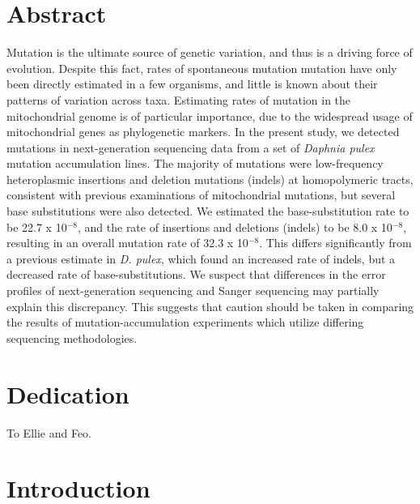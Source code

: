 \documentclass[12pt,twoside]{reedthesis}
\begin{document}
\doublespacing
\tableofcontents
\singlespacing

\listoftables

\listoffigures

\chapter*{Abstract}
Mutation is the ultimate source of genetic variation, and thus is a driving force of evolution.
Despite this fact, rates of spontaneous mutation mutation have only been directly estimated in a few organisms, and little is known about their patterns of variation across taxa.
Estimating rates of mutation in the mitochondrial genome is of particular importance, due to the widespread usage of mitochondrial genes as phylogenetic markers.
In the present study, we detected mutations in next-generation sequencing data from a set of \textit{Daphnia pulex} mutation accumulation lines.
The majority of mutations were low-frequency heteroplasmic insertions and deletion mutations (indels) at homopolymeric tracts, consistent with previous examinations of mitochondrial mutations, but several base substitutions were also detected.
We estimated the base-substitution rate to be 22.7 x 10$^{-8}$, and the rate of insertions and deletions (indels) to be 8.0 x 10$^{-8}$, resulting in an overall mutation rate of 32.3 x 10$^{-8}$.
This differs significantly from a previous estimate in \textit{D. pulex}, which found an increased rate of indels, but a decreased rate of base-substitutions.
We suspect that differences in the error profiles of next-generation sequencing and Sanger sequencing may partially explain this discrepancy.
This suggests that caution should be taken in comparing the results of mutation-accumulation experiments which utilize differing sequencing methodologies.

\chapter*{Dedication}
To Ellie and Feo.

\mainmatter %
\pagestyle{fancyplain} %

\chapter*{Introduction}
\end{document}
